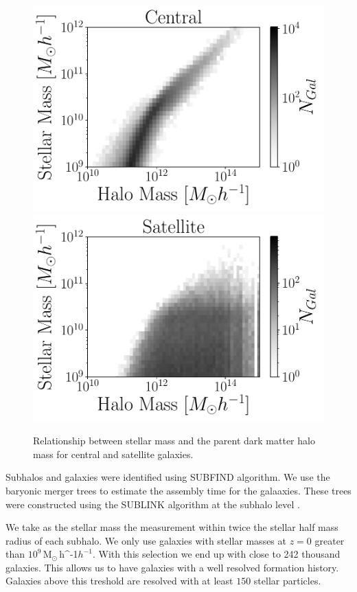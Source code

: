 \documentclass[fleqn,usenatbib]{mnras}
\newcommand{\Msunh}{\,{\rm M}$_{\odot}$\,\ifmmode h^{-1}\else $h^{-1}$\fi}
\begin{document}
\begin{figure}
    \centering
     \includegraphics[width=0.9\columnwidth]{figuras/his2_centrales.pdf}
    \includegraphics[width=0.9\columnwidth]{figuras/his2_satelite.pdf}
    \caption{Relationship between stellar mass and the parent dark
      matter halo mass for central and satellite galaxies.} 
    \label{fig:stellar_to_halo}
\end{figure}



Subhalos and galaxies were identified using SUBFIND algorithm.
We use the baryonic merger trees to estimate the assembly time for the
galaaxies.
These trees were constructed using the SUBLINK algorithm at the
subhalo level \citep{2015MNRAS.449...49R}.

We take as the stellar mass the measurement within
twice the stellar half mass radius of each subhalo.
We only use galaxies with stellar masses at $z=0$ greater than
$10^{9}$\Msunh.
With this selection we end up with close to 242 thousand galaxies.
This allows us to have galaxies with a well resolved formation
history. 
Galaxies above this treshold are resolved with at least $150$ stellar
particles. 
\end{document}
